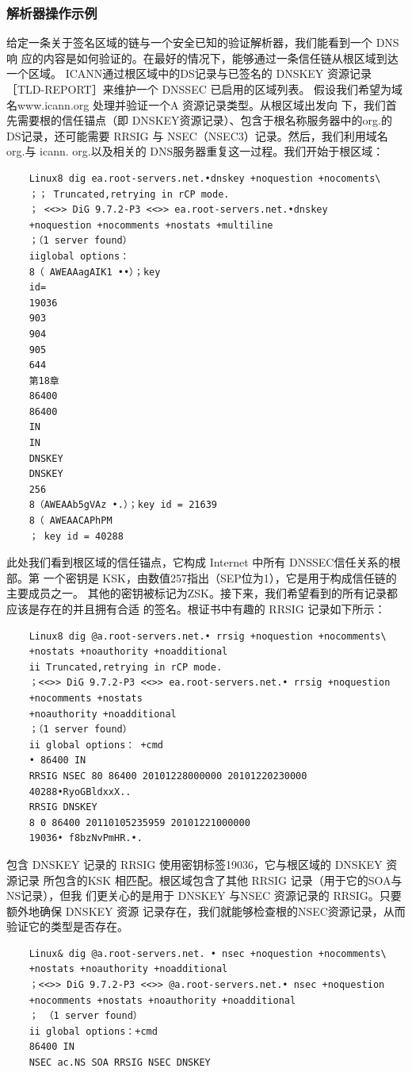 \subsubsection{解析器操作示例}
给定一条关于签名区域的链与一个安全已知的验证解析器，我们能看到一个 DNS响
应的内容是如何验证的。在最好的情况下，能够通过一条信任链从根区域到达一个区域。
ICANN通过根区域中的DS记录与已签名的 DNSKEY 资源记录［TLD-REPORT］来维护一个
DNSSEC 已启用的区域列表。
假设我们希望为域名www.icann.org 处理并验证一个A 资源记录类型。从根区域出发向
下，我们首先需要根的信任锚点（即 DNSKEY资源记录）、包含于根名称服务器中的org.的
DS记录，还可能需要 RRSIG 与 NSEC（NSEC3）记录。然后，我们利用域名 org.与 icann.
org.以及相关的 DNS服务器重复这一过程。我们开始于根区域：
\begin{verbatim}
    Linux8 dig ea.root-servers.net.•dnskey +noquestion +nocoments\
    ；； Truncated,retrying in rCP mode.
    ； <<>> DiG 9.7.2-P3 <<>> ea.root-servers.net.•dnskey
    +noquestion +nocomments +nostats +multiline
    ；（1 server found）
    iiglobal options：
    8（ AWEAAagAIK1 ••）；key
    id=
    19036
    903
    904
    905
    644
    第18章
    86400
    86400
    IN
    IN
    DNSKEY
    DNSKEY
    256
    8（AWEAAb5gVAz •.）；key id = 21639
    8（ AWEAACAPhPM
    ； key id = 40288
\end{verbatim}
此处我们看到根区域的信任锚点，它构成 Internet 中所有 DNSSEC信任关系的根部。第
一个密钥是 KSK，由数值257指出（SEP位为1），它是用于构成信任链的主要成员之一。
其他的密钥被标记为ZSK。接下来，我们希望看到的所有记录都应该是存在的并且拥有合适
的签名。根证书中有趣的 RRSIG 记录如下所示：
\begin{verbatim}
    Linux8 dig @a.root-servers.net.• rrsig +noquestion +nocomments\
    +nostats +noauthority +noadditional
    ii Truncated,retrying in rCP mode.
    ；<<>> DiG 9.7.2-P3 <<>> ea.root-servers.net.• rrsig +noquestion
    +nocomments +nostats
    +noauthority +noadditional
    ；（1 server found）
    ii global options： +cmd
    • 86400 IN
    RRSIG NSEC 80 86400 20101228000000 20101220230000
    40288•RyoGBldxxX..
    RRSIG DNSKEY
    8 0 86400 20110105235959 20101221000000
    19036• f8bzNvPmHR.•.
\end{verbatim}
包含 DNSKEY 记录的 RRSIG 使用密钥标签19036，它与根区域的 DNSKEY 资源记录
所包含的KSK 相匹配。根区域包含了其他 RRSIG 记录（用于它的SOA与NS记录），但我
们更关心的是用于 DNSKEY 与NSEC 资源记录的 RRSIG。只要额外地确保 DNSKEY 资源
记录存在，我们就能够检查根的NSEC资源记录，从而验证它的类型是否存在。
\begin{verbatim}
    Linux& dig @a.root-servers.net. • nsec +noquestion +nocomments\
    +nostats +noauthority +noadditional
    ；<<>> DiG 9.7.2-P3 <<>> @a.root-servers.net.• nsec +noquestion
    +nocomments +nostats +noauthority +noadditional
    ； （1 server found）
    ii global options：+cmd
    86400 IN
    NSEC ac.NS SOA RRSIG NSEC DNSKEY
\end{verbatim}
